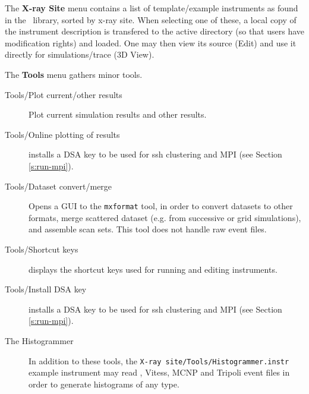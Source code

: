 \noindent The {\bfseries X-ray Site} menu contains a list of
template/example instruments as found in the \MCX\ library, sorted by
x-ray site. When selecting one of these, a local copy of the
instrument description is transfered to the active directory (so that
users have modification rights) and loaded. One may then view its source (Edit) and use it directly for simulations/trace (3D View).


\noindent The {\bfseries Tools} menu gathers minor tools.
\begin{description}
\item[Tools/Plot current/other results] Plot current simulation results and other results.
\item[Tools/Online plotting of results] installs a DSA key to be used for ssh clustering and MPI (see Section \ref{s:run-mpi}).
\item[Tools/Dataset convert/merge] Opens a GUI to the \verb+mxformat+ tool, in order to convert datasets to other formats, merge scattered dataset (e.g. from successive or grid simulations), and assemble scan sets. This tool does not handle raw event files.
\item[Tools/Shortcut keys] displays the shortcut keys used for running and editing instruments.
\item[Tools/Install DSA key] installs a DSA key to be used for ssh clustering and MPI (see Section \ref{s:run-mpi}).
\item[The Histogrammer] In addition to these tools, the \verb+X-ray site/Tools/Histogrammer.instr+ example instrument may read \MCX , Vitess, MCNP and Tripoli event files in order to generate histograms of any type.
\end{description}


